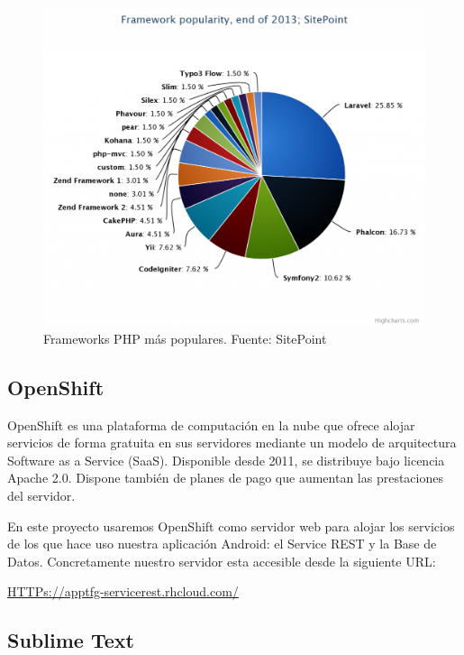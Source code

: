 \begin{figure}[!]
\centering
\includegraphics[keepaspectratio, scale=0.30]{Media/Captures/frameworkPopularity.png}
\caption{Frameworks PHP más populares. Fuente: SitePoint}
\label{fig:laravel5popularity}
\end{figure}
    
    \subsection{OpenShift}\label{ssec:openshift}
    
	OpenShift \cite{ref:OpenShift} es una plataforma de computación en la nube que ofrece alojar servicios de forma gratuita en sus servidores mediante un modelo de arquitectura Software as a Service (SaaS). Disponible desde 2011, se distribuye bajo licencia Apache 2.0. Dispone también de planes de pago que aumentan las prestaciones del servidor.
	
	En este proyecto usaremos OpenShift como servidor web para alojar los servicios de los que hace uso nuestra aplicación Android: el Service REST y la Base de Datos. Concretamente nuestro servidor esta accesible desde la siguiente URL:
	
	\url{HTTPs://apptfg-servicerest.rhcloud.com/}    
    
    \subsection{Sublime Text}\label{ssec:sublime}
    
